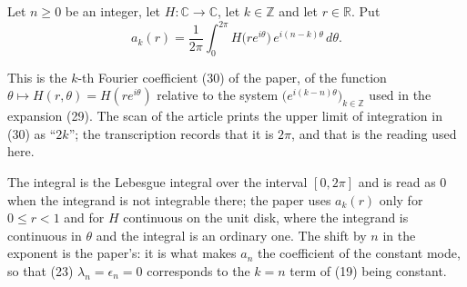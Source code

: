 \begin{definition}
Let $n\ge0$ be an integer, let $H\colon\mathbb{C}\to\mathbb{C}$, let
$k\in\mathbb{Z}$ and let $r\in\mathbb{R}$.  Put
\[
  a_k(r)=\frac1{2\pi}\int_0^{2\pi}H\bigl(re^{i\theta}\bigr)\,e^{i(n-k)\theta}\,d\theta .
\]

This is the $k$-th Fourier coefficient (30) of the paper, of the function
$\theta\mapsto H(r,\theta)=H(re^{i\theta})$ relative to the system
$\bigl(e^{i(k-n)\theta}\bigr)_{k\in\mathbb{Z}}$ used in the expansion (29).
The scan of the article prints the upper limit of integration in (30) as
``$2k$''; the transcription records that it is $2\pi$, and that is the reading
used here.

The integral is the Lebesgue integral over the interval $[0,2\pi]$ and is read
as $0$ when the integrand is not integrable there; the paper uses $a_k(r)$ only
for $0\le r<1$ and for $H$ continuous on the unit disk, where the integrand is
continuous in $\theta$ and the integral is an ordinary one.  The shift by $n$ in
the exponent is the paper's: it is what makes $a_n$ the coefficient of the
constant mode, so that (23) $\lambda_n=\epsilon_n=0$ corresponds to the $k=n$
term of (19) being constant.
\end{definition}
